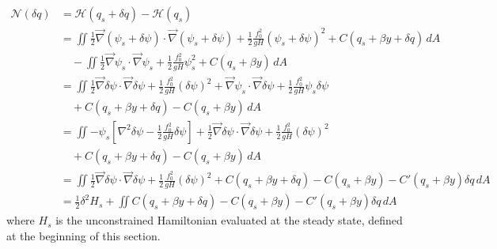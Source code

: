 \documentclass[12pt]{article}
\begin{document}
{{        \begin{align*}
            \mathcal{N}(\delta q)
            &= \mathcal{H}(q_s + \delta q) - \mathcal{H}(q_s) \\
            &= \iint  \frac12 \vec\nabla(\psi_s + \delta \psi) \cdot \vec\nabla(\psi_s + \delta \psi) + \frac12 \frac{f_0^2}{g H} (\psi_s + \delta \psi)^2 + C(q_s + \beta y + \delta q) \, dA \\
            &\quad - \iint  \frac12 \vec\nabla\psi_s \cdot \vec\nabla\psi_s + \frac12 \frac{f_0^2}{g H} \psi_s^2 + C(q_s + \beta y) \, dA \\
            &= \iint \frac12 \vec\nabla\delta\psi \cdot \vec\nabla\delta\psi + \frac12 \frac{f_0^2}{g H} (\delta \psi)^2 + \vec\nabla\psi_s \cdot \vec\nabla\delta\psi + \frac12 \frac{f_0^2}{g H} \psi_s\delta\psi \\
            &\quad + C(q_s + \beta y + \delta q) - C(q_s + \beta y) \, dA \\
            &= \iint -\psi_s \left[ \nabla^2\delta\psi - \frac12 \frac{f_0^2}{g H} \delta\psi \right] + \frac12 \vec\nabla\delta\psi \cdot \vec\nabla\delta\psi + \frac12 \frac{f_0^2}{g H}(\delta\psi)^2 \\
            &\quad + C(q_s + \beta y + \delta q) - C(q_s + \beta y) \, dA \\
            &= \iint \frac12 \vec\nabla\delta\psi \cdot \vec\nabla\delta\psi + \frac12 \frac{f_0^2}{g H}(\delta \psi)^2 + C(q_s + \beta y + \delta q) - C(q_s + \beta y) -C'(q_s + \beta y)\delta q\, dA \\
            &= \frac12 \delta^2 H_s + \iint C(q_s + \beta y + \delta q) - C(q_s + \beta y) -C'(q_s + \beta y)\delta q\, dA
        \end{align*}
        where $H_s$ is the unconstrained Hamiltonian evaluated at the steady state, defined at the beginning of this section.
    }
}

\newpage
\end{document}
